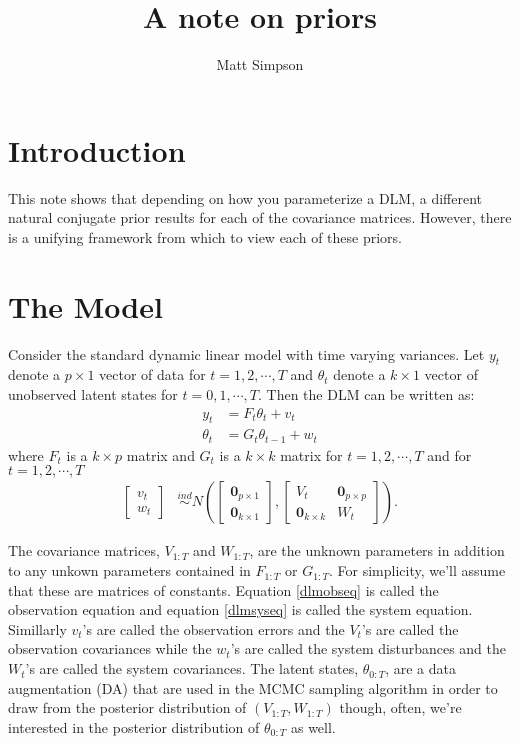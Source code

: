 \documentclass{article}
\begin{document}
\title{A note on priors}
\author{Matt Simpson}
\maketitle


\section{Introduction}
This note shows that depending on how you parameterize a DLM, a different natural conjugate prior results for each of the covariance matrices. However, there is a unifying framework from which to view each of these priors.

\section{The Model}
Consider the standard dynamic linear model with time varying variances. Let $y_t$ denote a $p\times 1$ vector of data for $t=1,2,\cdots,T$ and $\theta_t$ denote a $k\times 1$ vector of unobserved latent states for $t=0,1,\cdots,T$. Then the DLM can be written as:
\begin{align}
  y_t & = F_t\theta_t + v_t \label{dlmobseq}\\
  \theta_t & = G_t\theta_{t-1} + w_t \label{dlmsyseq}
\end{align}
where $F_t$ is a $k\times p$ matrix and $G_t$ is a $k \times k$ matrix for $t=1,2,\cdots,T$ and for $t=1,2,\cdots,T$
\begin{align*}
  \begin{bmatrix} v_t \\ w_t \end{bmatrix} &\stackrel{ind}{\sim} N\left(\begin{bmatrix} \bm{0}_{p\times 1} \\ \bm{0}_{k\times 1} \end{bmatrix}, \begin{bmatrix} V_t & \bm{0}_{p\times p} \\ \bm{0}_{k\times k} & W_t \end{bmatrix} \right).
\end{align*}

The covariance matrices, $V_{1:T}$ and $W_{1:T}$, are the unknown parameters in addition to any unkown parameters contained in $F_{1:T}$ or $G_{1:T}$. For simplicity, we'll assume that these are matrices of constants. Equation \eqref{dlmobseq} is called the observation equation and equation \eqref{dlmsyseq} is called the system equation. Simillarly $v_t$'s are called the observation errors and the $V_t$'s are called the observation covariances while the $w_t$'s are called the system disturbances and the $W_t$'s are called the system covariances. The latent states, $\theta_{0:T}$, are a data augmentation (DA) that are used in the MCMC sampling algorithm in order to draw from the posterior distribution of $(V_{1:T},W_{1:T})$ though, often, we're interested in the posterior distribution of $\theta_{0:T}$ as well.
\end{document}
